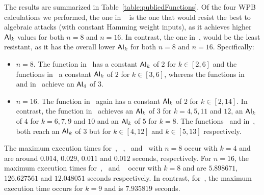 \documentclass[11pt]{llncs}
\begin{document}
The results are summarized in Table~\ref{table:publiedFunctions}. 
Of the four WPB calculations we performed, the one in ~\cite{CC:TangLiu19} is the one that would resist the best to algebraic attacks (with constant Hamming weight inputs), as it achieves higher $\mathsf{AI}_{k}$ values for both $n = 8$ and $ n = 16$. In contrast, the one in~\cite{Mat:ZJZQ23}, would be the least resistant, as it has the overall lower $\mathsf{AI}_{k}$ for both $n=8$ and $n=16$. Specifically:
\begin{itemize}
\item $n=8$. 
The function in~\cite{Mat:ZJZQ23} has a constant $\mathsf{AI}_{k}$ of $2$ for $k \in [2, 6]$ and the functions in~\cite{TOSC:CarMeaRot17} a constant $\mathsf{AI}_{k}$ of $2$ for $k \in [3, 6]$, whereas the functions in~\cite{AMC:DalMal23} and in~\cite{CC:TangLiu19} achieve an $\mathsf{AI}_{4}$ of $3$.

\item $n=16$. 
The function in~\cite{Mat:ZJZQ23} again has a constant $\mathsf{AI}_{k}$ of $2$ for $k \in [2, 14]$. 
In contrast, the function in~\cite{CC:TangLiu19} achieves an $\mathsf{AI}_{k}$ of $3$ for $k = 4,5,11$ and $12$, an $\mathsf{AI}_{k}$ of $4$ for $k = 6,7,9$ and $10$ and an $\mathsf{AI}_{k}$ of $5$ for $k=8$. The functions~\cite{AMC:DalMal23} and in~\cite{TOSC:CarMeaRot17}, both reach an $\mathsf{AI}_{k}$ of $3$ but for $k\in [4,12]$ and $k\in [5,13]$ respectively.
\end{itemize}

The maximum execution times for~\cite{AMC:DalMal23}, ~\cite{Mat:ZJZQ23},~\cite{CC:TangLiu19} and~\cite{TOSC:CarMeaRot17} with $n=8$ occur with $k=4$ and are around $0.014$, $0.029$, $0.011$ and $0.012$ seconds, respectively.
For $n=16$, the maximum execution times for~\cite{Mat:ZJZQ23},~\cite{CC:TangLiu19} and ~\cite{TOSC:CarMeaRot17} occur with $k=8$ and are $5.898671$, $126.627561$ and $12.048051$ seconds respectively. In contrast, for~\cite{AMC:DalMal23}, the maximum execution time occurs for $k=9$ and is $7.935819$ seconds.
\end{document}
